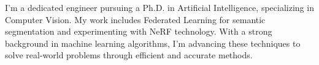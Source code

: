 %
%
%
\par{
    I'm a dedicated engineer pursuing a Ph.D. in Artificial Intelligence, specializing in Computer Vision. My work includes Federated Learning for semantic segmentation and experimenting with NeRF technology. With a strong background in machine learning algorithms, I'm advancing these techniques to solve real-world problems through efficient and accurate methods.}